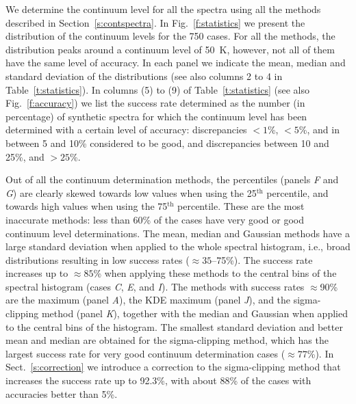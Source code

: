 \documentclass{aa}
\begin{document}
We determine the continuum level for all the spectra using all the methods described in Section~\ref{s:contspectra}. In Fig.~\ref{f:statistics} we present the distribution of the continuum levels for the 750 cases. For all the methods, the distribution peaks around a continuum level of 50~K, however, not all of them have the same level of accuracy. In each panel we indicate the mean, median and standard deviation of the distributions (see also columns 2 to 4 in Table~\ref{t:statistics}). In columns (5) to (9) of Table~\ref{t:statistics} (see also Fig.~\ref{f:accuracy}) we list the success rate determined as the number (in percentage) of synthetic spectra for which the continuum level has been determined with a certain level of accuracy: discrepancies $<1$\%, $<5$\%, and in between 5 and 10\% considered to be good, and discrepancies between 10 and 25\%, and $>25$\%.

Out of all the continuum determination methods, the percentiles (panels \textit{F} and \textit{G}) are clearly skewed towards low values when using the 25$^\mathrm{th}$ percentile, and towards high values when using the 75$^\mathrm{th}$ percentile. These are the most inaccurate methods: less than 60\% of the cases have very good or good continuum level determinations. The mean, median and Gaussian methods have a large standard deviation when applied to the whole spectral histogram, i.e., broad distributions resulting in low success rates ($\approx35$--75\%). The success rate increases up to $\approx85$\% when applying these methods to the central bins of the spectral histogram (cases \textit{C}, \textit{E}, and \textit{I}). The methods with success rates $\approx$90\% are the maximum (panel \textit{A}), the KDE maximum (panel \textit{J}), and the sigma-clipping method (panel \textit{K}), together with the median and Gaussian when applied to the central bins of the histogram. The smallest standard deviation and better mean and median are obtained for the sigma-clipping method, which has the largest success rate for very good continuum determination cases ($\approx77$\%). In Sect.~\ref{s:correction} we introduce a correction to the sigma-clipping method that increases the success rate up to 92.3\%, with about 88\% of the cases with accuracies better than 5\%.
\end{document}
